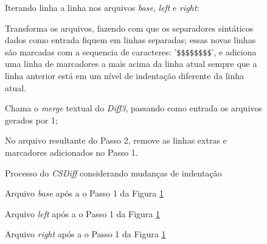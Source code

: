 \begin{figure}[ht]
	\begin{center}
		\begin{compactenum}[(1)]
			\item Iterando linha a linha nos arquivos \emph{base}, \emph{left} e \emph{right}:
			\begin{compactenum}
                \item Transforma os arquivos, fazendo com que os separadores
                    sintáticos dados como entrada fiquem em linhas separadas;
                    essas novas linhas são marcadas com a sequencia de
                    caracteres: '\verb|$$$$$$$$|', e adiciona uma linha de
                    marcadores a mais acima da linha atual sempre que a linha
                    anterior está em um nível de indentação diferente da linha
                    atual.
			\end{compactenum}
            \item Chama o \emph{merge} textual do \emph{Diff3}, passando como
                entrada os arquivos gerados por 1;
            \item No arquivo resultante do Passo 2, remove as linhas extras e
                marcadores adicionados no Passo 1.
		\end{compactenum}
	\end{center}
	\caption{Processo do \emph{CSDiff} considerando mudanças de indentação}\label{csdiff_process_indentation}
\end{figure}

\begin{figure}[ht]
	\begin{center}
		
		\caption{Arquivo \emph{base} após a o Passo 1 da Figura
			\ref{csdiff_process_indentation}}\label{base_marcadores_indentacao}
	\end{center}
\end{figure}

\begin{figure}[ht]
	\begin{center}
		
		\caption{Arquivo \emph{left} após a o Passo 1 da Figura
			\ref{csdiff_process_indentation}}\label{left_marcadores_indentacao}
	\end{center}
\end{figure}

\begin{figure}[ht]
	\begin{center}
		
		\caption{Arquivo \emph{right} após a o Passo 1 da Figura
			\ref{csdiff_process_indentation}}\label{right_marcadores_indentacao}
	\end{center}
\end{figure}

